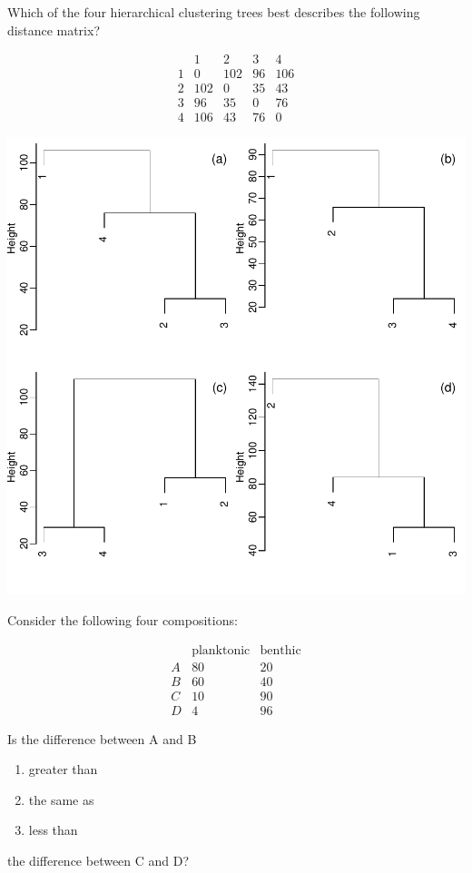 \documentclass{article}
\begin{document}
\begin{minipage}{10cm}

Which of the four hierarchical clustering trees best describes the
following distance matrix?

\[
\begin{array}{c|cccc}
  & 1 & 2 & 3 & 4 \\ \hline
  1 & 0 & 102 & 96 & 106 \\
  2 & 102 & 0 & 35 & 43 \\
  3 & 96 & 35 & 0 & 76 \\
  4 & 106 & 43 & 76 & 0
\end{array}
\]

\includegraphics[width=\linewidth]{unsupervised-hclust.pdf}

\end{minipage}

\begin{minipage}{10cm}

Consider the following four compositions:

\[
\begin{array}{c|cc}
  & \mbox{planktonic} & \mbox{benthic} \\ \hline
  A & 80 & 20 \\
  B & 60 & 40 \\
  C & 10 & 90 \\
  D & 4 & 96
\end{array}
\]

Is the difference between A and B

\begin{enumerate}
\item greater than
\item the same as
\item less than
\end{enumerate}

the difference between C and D?

\end{minipage}
\end{document}
